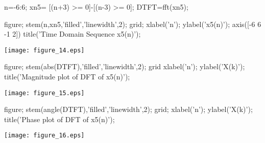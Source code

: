 \documentclass[12pt, onecolumn]{IEEEtran}
\begin{document}
\begin{matlabcode}
	n=-6:6; %
	xn5= [(n+3) >= 0]-[(n-3) >= 0]; %
	DTFT=fft(xn5);
	
	figure;
	stem(n,xn5,'filled','linewidth',2); grid; %
	xlabel('n'); ylabel('x5(n)'); axis([-6 6 -1 2])
	title('Time Domain Sequence x5(n)');
\end{matlabcode}
\begin{center}
	\texttt{[image: figure\_14.eps]}
\end{center}
\begin{matlabcode}
	
	figure;
	stem(abs(DTFT),'filled','linewidth',2); grid
	xlabel('n'); 
	ylabel('X(k)');
	title('Magnitude plot of DFT of x5(n)');
\end{matlabcode}
\begin{center}
	\texttt{[image: figure\_15.eps]}
\end{center}
\begin{matlabcode}
	
	figure;
	stem(angle(DTFT),'filled','linewidth',2); grid; %
	xlabel('n'); ylabel('X(k)');
	title('Phase plot of DFT of x5(n)');
\end{matlabcode}
\begin{center}
	\texttt{[image: figure\_16.eps]}
\end{center}
\end{document}
